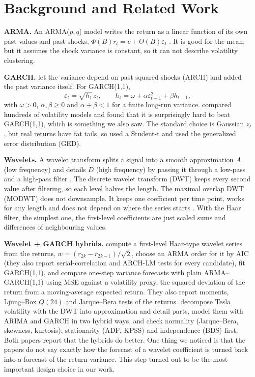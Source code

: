 \documentclass{article}
\begin{document}
\section{Background and Related Work}
\label{sec:background}

\textbf{ARMA.} An ARMA($p,q$) model writes the return as a linear function of its own past values and past shocks, $\Phi(B)r_t=c+\Theta(B)\varepsilon_t$ \cite{box2015}. It is good for the mean, but it assumes the shock variance is constant, so it can not describe volatility clustering.

\textbf{GARCH.} \citet{engle1982} let the variance depend on past squared shocks (ARCH) and \citet{bollerslev1986} added the past variance itself. For GARCH(1,1),
\begin{equation}
\varepsilon_t=\sqrt{h_t}\,z_t,\qquad h_t=\omega+\alpha\varepsilon_{t-1}^2+\beta h_{t-1},
\label{eq:garch}
\end{equation}
with $\omega>0$, $\alpha,\beta\ge0$ and $\alpha+\beta<1$ for a finite long-run variance. \citet{hansen2005} compared hundreds of volatility models and found that it is surprisingly hard to beat GARCH(1,1), which is something we also saw. The standard choice is Gaussian $z_t$, but real returns have fat tails, so \citet{bollerslev1987} used a Student-t and \citet{nelson1991} used the generalized error distribution (GED).

\textbf{Wavelets.} A wavelet transform splits a signal into a smooth approximation $A$ (low frequency) and details $D$ (high frequency) by passing it through a low-pass and a high-pass filter \cite{mallat1989}. The discrete wavelet transform (DWT) keeps every second value after filtering, so each level halves the length. The maximal overlap DWT (MODWT) does not downsample. It keeps one coefficient per time point, works for any length and does not depend on where the series starts \cite{percival2000}. With the Haar filter, the simplest one, the first-level coefficients are just scaled sums and differences of neighbouring values.

\textbf{Wavelet + GARCH hybrids.} \citet{ismail2016} compute a first-level Haar-type wavelet series from the returns, $w=(r_{2k}-r_{2k-1})/\sqrt2$, choose an ARMA order for it by AIC (they also report serial-correlation and ARCH-LM tests for every candidate), fit GARCH(1,1), and compare one-step variance forecasts with plain ARMA--GARCH(1,1) using MSE against a volatility proxy, the squared deviation of the return from a moving-average expected return. They also report moments, Ljung--Box $Q(24)$ and Jarque--Bera tests of the returns. \citet{rubio2023} decompose Tesla volatility with the DWT into approximation and detail parts, model them with ARIMA and GARCH in two hybrid ways, and check normality (Jarque--Bera, skewness, kurtosis), stationarity (ADF, KPSS) and independence (BDS) first. Both papers report that the hybrids do better. One thing we noticed is that the papers do not say exactly how the forecast of a wavelet coefficient is turned back into a forecast of the return variance. This step turned out to be the most important design choice in our work.
\end{document}
